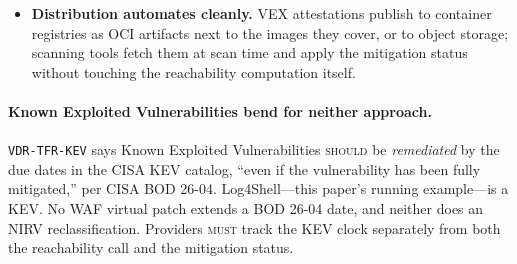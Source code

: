 \documentclass[11pt]{article}
\newcommand{\code}[1]{\texttt{#1}}
\newcommand{\rfckw}[1]{\textsc{#1}}
\begin{document}
\begin{itemize}[leftmargin=1.5em]
\item \textbf{Distribution automates cleanly.} VEX attestations publish to container registries as OCI artifacts next to the images they cover, or to object storage; scanning tools fetch them at scan time and apply the mitigation status without touching the reachability computation itself.
\end{itemize}

\paragraph{Known Exploited Vulnerabilities bend for neither approach.} \code{VDR-TFR-KEV} says Known Exploited Vulnerabilities \rfckw{should} be \emph{remediated} by the due dates in the CISA KEV catalog, ``even if the vulnerability has been fully mitigated,'' per CISA BOD 26-04. Log4Shell---this paper's running example---is a KEV. No WAF virtual patch extends a BOD 26-04 date, and neither does an NIRV reclassification. Providers \rfckw{must} track the KEV clock separately from both the reachability call and the mitigation status.
\end{document}
